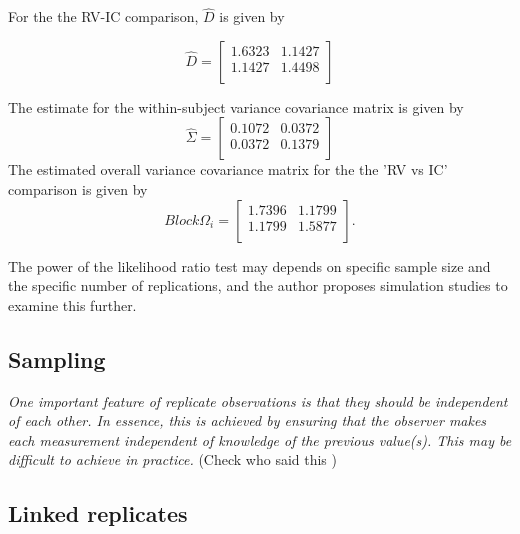 \documentclass[12pt, a4paper]{report}
\theoremstyle{plain}
\theoremstyle{definition}
\theoremstyle{remark}
\begin{document}
For the the RV-IC comparison, $\hat{D}$ is given by


\begin{equation}
\hat{D}= \left[ \begin{array}{cc}
1.6323 & 1.1427  \\
1.1427 & 1.4498 \\
\end{array} \right]
\end{equation}

The estimate for the within-subject variance covariance matrix is
given by
\begin{equation}
\hat{\Sigma}= \left[ \begin{array}{cc}
0.1072 & 0.0372  \\
0.0372 & 0.1379  \\
\end{array}\right]
\end{equation}
The estimated overall variance covariance matrix for the the 'RV
vs IC' comparison is given by
\begin{equation}
Block \Omega_{i}= \left[ \begin{array}{cc}
1.7396 & 1.1799  \\
1.1799 & 1.5877  \\
\end{array} \right].
\end{equation}

The power of the
likelihood ratio test may depends on specific sample size and the
specific number of  replications, and the author proposes
simulation studies to examine this further.



\newpage
\newpage


\subsection{Sampling}
	\emph{
		One important feature of replicate observations is that they should be independent
		of each other. In essence, this is achieved by ensuring that the observer makes each
		measurement independent of knowledge of the previous value(s). This may be difficult
		to achieve in practice.} (Check who said this
	)
	
\subsection{Linked replicates}
\end{document}
